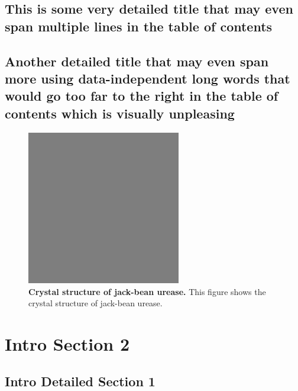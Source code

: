 \documentclass[pdftex, a4paper, oneside, 12pt, bibtotoc, idxtotoc ]{scrreprt}
\begin{document}
\subsection{This is some very detailed title that may even span multiple lines
in the table of contents}
\blindtext[2]
\subsection{Another detailed title that may even span more
using data-independent long words that would go too far to the right in the
table of contents which is visually unpleasing }
\blindtext[2]

\begin{figure}[tb]
  \center
  \includegraphics[width=0.6\textwidth]{dummy.png}
  \caption[Crystal structure of jack-bean urease]
  {  \textbf{Crystal structure of jack-bean urease.} This figure shows the crystal
     structure of jack-bean urease.  }
  \label{fig:fig1}
\end{figure}

\section{Intro Section 2}
\blindtext[1]

\subsection{Intro Detailed Section 1}
\blindtext[2]
\end{document}
